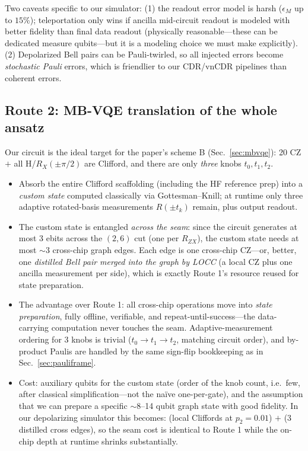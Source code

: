 \documentclass[11pt]{article}
\newcommand{\RZX}{R_{ZX}}
\begin{document}
\noindent Two caveats specific to our simulator: (1) the readout error model
is harsh ($\epsilon_M$ up to $15\%$); teleportation only wins if ancilla
mid-circuit readout is modeled with better fidelity than final data readout
(physically reasonable---these can be dedicated measure qubits---but it is a
modeling choice we must make explicitly). (2) Depolarized Bell pairs can be
Pauli-twirled, so all injected errors become \emph{stochastic Pauli} errors,
which is friendlier to our CDR/vnCDR pipelines than coherent errors.

\subsection{Route 2: MB-VQE translation of the whole ansatz}

Our circuit is the ideal target for the paper's scheme B
(Sec.~\ref{sec:mbvqe}): 20 CZ $+$ all H/$R_X(\pm\pi/2)$ are Clifford, and
there are only \emph{three} knobs $t_0, t_1, t_2$.

\begin{itemize}[leftmargin=2em]
  \item Absorb the entire Clifford scaffolding (including the HF reference
        prep) into a \emph{custom state} computed classically via
        Gottesman--Knill; at runtime only three adaptive rotated-basis
        measurements $R(\pm t_k)$ remain, plus output readout.
  \item The custom state is entangled \emph{across the seam}: since the
        circuit generates at most 3 ebits across the $(2,6)$ cut (one per
        $\RZX$), the custom state needs at most $\sim$3 cross-chip graph
        edges. Each edge is one cross-chip CZ---or, better, one
        \emph{distilled Bell pair merged into the graph by LOCC} (a local CZ
        plus one ancilla measurement per side), which is exactly Route 1's
        resource reused for state preparation.
  \item The advantage over Route 1: all cross-chip operations move into
        \emph{state preparation}, fully offline, verifiable, and
        repeat-until-success---the data-carrying computation never touches the
        seam. Adaptive-measurement ordering for 3 knobs is trivial
        ($t_0 \to t_1 \to t_2$, matching circuit order), and by-product
        Paulis are handled by the same sign-flip bookkeeping as in
        Sec.~\ref{sec:pauliframe}.
  \item Cost: auxiliary qubits for the custom state (order of the knob count,
        i.e.\ few, after classical simplification---not the na\"ive
        one-per-gate), and the assumption that we can prepare a
        specific $\sim$8--14 qubit graph state with good fidelity. In our
        depolarizing simulator this becomes: (local Cliffords at
        $p_2 = 0.01$) $+$ (3 distilled cross edges), so the seam cost is
        identical to Route 1 while the on-chip depth at runtime shrinks
        substantially.
\end{itemize}
\end{document}
